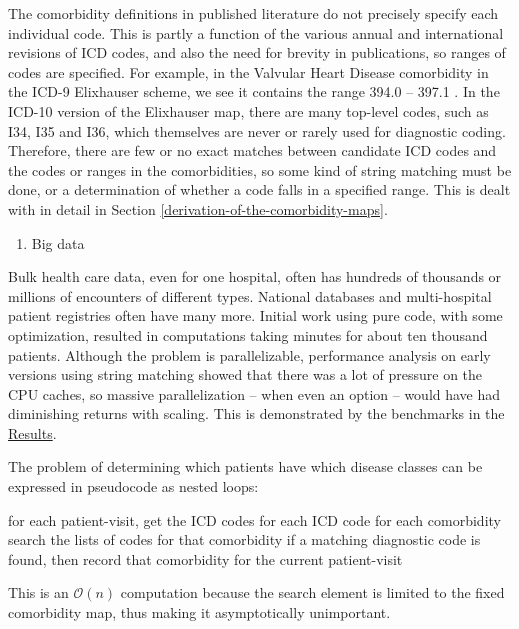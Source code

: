\documentclass[article]{jss}
\providecommand{\tightlist}{%
  \setlength{\itemsep}{0pt}\setlength{\parskip}{0pt}}
\begin{document}
The comorbidity definitions in published literature do not precisely
specify each individual code. This is partly a function of the various
annual and international revisions of ICD codes, and also the need for
brevity in publications, so ranges of codes are specified. For example,
in the Valvular Heart Disease comorbidity in the ICD-9 Elixhauser
scheme, we see it contains the range 394.0 -- 397.1 . In the ICD-10
version of the Elixhauser map, there are many top-level codes, such as
I34, I35 and I36, which themselves are never or rarely used for
diagnostic coding. Therefore, there are few or no exact matches between
candidate ICD codes and the codes or ranges in the comorbidities, so
some kind of string matching must be done, or a determination of whether
a code falls in a specified range. This is dealt with in detail in
Section \ref{derivation-of-the-comorbidity-maps}.

\begin{enumerate}
\def\labelenumi{\arabic{enumi}.}
\setcounter{enumi}{2}
\tightlist
\item
  Big data
\end{enumerate}

Bulk health care data, even for one hospital, often has hundreds of
thousands or millions of encounters of different types. National
databases and multi-hospital patient registries often have many more.
Initial work using pure  code, with some optimization,
resulted in computations taking minutes for about ten thousand patients.
Although the problem is parallelizable, performance analysis on early
versions using string matching showed that there was a lot of pressure
on the CPU caches, so massive parallelization -- when even an option --
would have had diminishing returns with scaling. This is demonstrated by
the benchmarks in the \protect\hyperlink{results}{Results}.

The problem of determining which patients have which disease classes can
be expressed in pseudocode as nested loops:

\begin{Code}
for each patient-visit, get the ICD codes
  for each ICD code
    for each comorbidity
      search the lists of codes for that comorbidity
      if a matching diagnostic code is found, then
        record that comorbidity for the current patient-visit
\end{Code}

\label{pseudocode}

This is an \(\mathcal{O}(n)\) computation because the search element is
limited to the fixed comorbidity map, thus making it asymptotically
unimportant.
\end{document}
